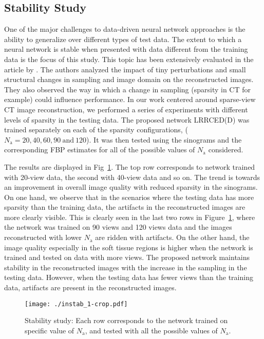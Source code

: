 \subsection{Stability Study}
One of the major challenges to data-driven neural network approaches is the ability to generalize over different types of test data. The extent to which a neural network is stable when presented with data different from the training data is the focus of this study. This topic has been extensively evaluated in the article by \cite{antun2020instabilities}. The authors analyzed the impact of tiny perturbations and small structural changes in sampling and image domain on the reconstructed images. They also observed the way in which a change in sampling (sparsity in \ac{CT} for example) could influence performance. In our work centered around sparse-view \ac{CT} image reconstruction, we performed a series of experiments with different levels of sparsity in the testing data. The proposed network \ac{LRRCED}(D) was trained separately on each of the sparsity configurations, ($N_\mathrm{a}= 20,40,60,90 \: \mathrm{and} \:  120$). It was then tested using the sinograms and the corresponding \ac{FBP} estimates for all of the possible values of $N_\mathrm{a}$ considered.

The results are displayed in Fig~\ref{fig:ins1}. The top row corresponds to network trained with 20-view data, the second with 40-view data and so on. The trend is towards an improvement in overall image quality with reduced sparsity in the sinograms. On one hand, we observe that in the scenarios where the testing data has more sparsity than the training data, the artifacts in the reconstructed images are more clearly visible. This is clearly seen in the last two rows in Figure~\ref{fig:ins1}, where the network was trained on 90 views and 120 views data and the images  reconstructed with lower $N_\mathrm{a}$ are ridden with artifacts. On the other hand, the image quality especially in the soft tissue regions is higher when the network is trained and tested on data with more views. The proposed network maintains stability in the reconstructed images with the increase in the sampling in the testing data. However, when the testing data has fewer views than the training data, artifacts are present in the reconstructed images.
\begin{figure}[!t]
	\centering
	\texttt{[image: ./instab\_1-crop.pdf]}\hfill
	\caption{Stability study: Each row corresponds to the network trained on specific value of $N_\mathrm{a}$, and tested with all the possible values of $N_\mathrm{a}$.}\label{fig:ins1}
\end{figure}

